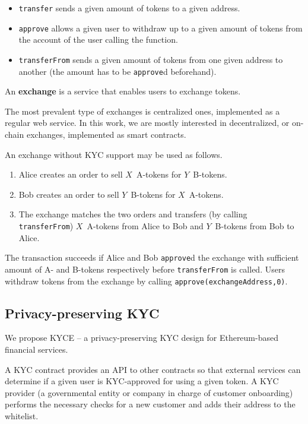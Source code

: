 \begin{itemize}
	\item \texttt{transfer} sends a given amount of tokens to a given address.
	\item \texttt{approve} allows a given user to withdraw up to a given amount of tokens from the account of the user calling the function.
	\item \texttt{transferFrom} sends a given amount of tokens from one given address to another (the amount has to be \texttt{approve}d beforehand).
\end{itemize}

\begin{definition}
	An \textbf{exchange} is a service that enables users to exchange tokens.
\end{definition}

The most prevalent type of exchanges is centralized ones, implemented as a regular web service.
In this work, we are mostly interested in decentralized, or on-chain exchanges, implemented as smart contracts. 

An exchange without KYC support may be used as follows.
\begin{enumerate}
	\item Alice creates an order to sell $X$~A-tokens for $Y$~B-tokens.
	\item Bob creates an order to sell $Y$~B-tokens for $X$~A-tokens.
	\item The exchange matches the two orders and transfers (by calling \texttt{transferFrom}) $X$~A-tokens from Alice to Bob and $Y$~B-tokens from Bob to Alice.
\end{enumerate}

The transaction succeeds if Alice and Bob \texttt{approve}d the exchange with sufficient amount of A- and B-tokens respectively before \texttt{transferFrom} is called.
Users withdraw tokens from the exchange by calling \texttt{approve(exchangeAddress,0)}.



\subsection{Privacy-preserving KYC}
\label{sec:PrivacyPreservingKYC}

We propose KYCE -- a privacy-preserving KYC design for Ethereum-based financial services.

A KYC contract provides an API to other contracts so that external services can determine if a given user is KYC-approved for using a given token.
A KYC provider (a governmental entity or company in charge of customer onboarding) performs the necessary checks for a new customer and adds their address to the whitelist.


